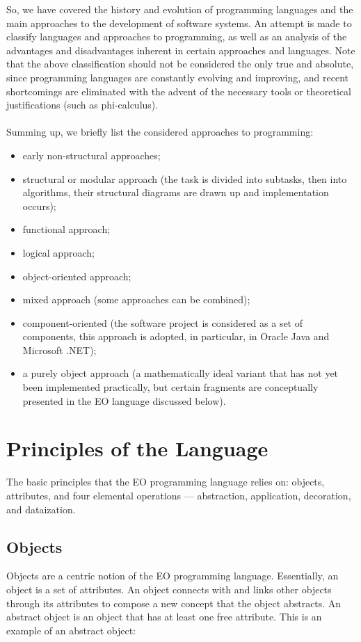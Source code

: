 \documentclass[12pt]{book}
\begin{document}
So, we have covered the  history and evolution of programming languages  and the main approaches to the development of software systems. An attempt is made to classify languages and approaches to programming, as well as an analysis of the advantages and disadvantages inherent in certain approaches and languages. Note that the above classification should not be considered the only true and absolute, since programming languages are constantly evolving and improving, and recent shortcomings are eliminated with the advent of the necessary tools or theoretical justifications (such as phi-calculus).
\\
\\
Summing up, we briefly list the considered approaches to programming:
\begin{itemize}
    \item early non-structural approaches;
    \item structural or modular approach (the task is divided into subtasks, then into algorithms, their structural diagrams are drawn up and implementation occurs);
    \item functional  approach;
    \item logical approach;
    \item object-oriented approach;
    \item mixed approach (some approaches can be combined);
    \item component-oriented (the software project is considered as a set of components, this approach is adopted, in particular, in Oracle Java and Microsoft .NET);
    \item a purely object approach (a mathematically ideal variant that has not yet been implemented practically, but certain fragments are conceptually presented in the EO language discussed below).
\end{itemize}


\chapter{Principles of the Language}

The basic principles that the EO programming language relies on: objects, attributes, and four elemental operations — abstraction, application, decoration, and dataization.

\section{Objects}
Objects are a centric notion of the EO programming language. Essentially, an object is a set of attributes. An object connects with and links other objects through its attributes to compose a new concept that the object abstracts.
An abstract object is an object that has at least one free attribute.
This is an example of an abstract object:
\end{document}
